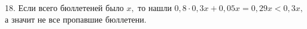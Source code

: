 18. Если всего бюллетеней было $x,$ то нашли $0,8\cdot0,3x+0,05x=0,29x<0,3x,$ а значит не все пропавшие бюллетени.\\
